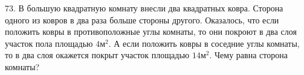 73. В большую квадратную комнату внесли два квадратных ковра. Сторона одного из ковров в два раза больше стороны другого. Оказалось, что если положить ковры в противоположные углы комнаты, то они покроют в два слоя участок пола площадью $4\text{м}^2.$ А если положить ковры в соседние углы комнаты, то в два слоя окажется покрыт участок площадью $14\text{м}^2.$ Чему равна сторона комнаты?\\
